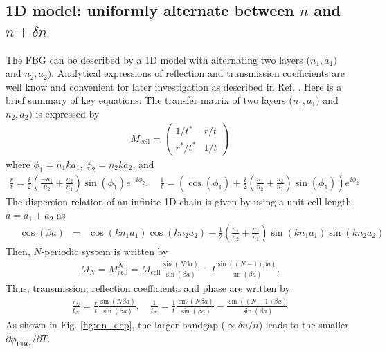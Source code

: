 \documentclass[aps,pra, onecolumn,superscriptaddress,nopacs,floatfix, showkeys, notitlepage]{revtex4-1}
\begin{document}
\subsection{1D model: uniformly alternate between $n$ and $n+\delta n$}
The FBG can be described by a 1D model with alternating two layers ($n_1, a_1)$ and $n_2, a_2)$. 
Analytical expressions of reflection and transmission coefficients are well know and convenient for later investigation as described in Ref. \cite{Bendickson1996}.
Here is a brief summary of key equations:
The transfer matrix of two layers ($n_1, a_1)$ and $n_2, a_2)$ is expressed by
\begin{eqnarray}
    M_{\mathrm{cell}}=\left(\begin{array}{cc}
1 / t^* & r / t \\
r^* / t^* & 1 / t
\end{array}\right)
\label{eq:tmat}
\end{eqnarray}
where $\phi_1=n_1 k a_1$, $\phi_2=n_2 k a_2$, and
\begin{eqnarray}
\frac{r}{t}  =\frac{i}{2}\left(\frac{-n_1}{n_2}+\frac{n_2}{n_1}\right) \sin \left(\phi_1\right) e^{-i\phi_2}, \quad
\frac{1}{t}  =\left(\cos \left(\phi_1\right)+\frac{i}{2}\left(\frac{n_1}{n_2}+\frac{n_2}{n_1}\right) \sin \left(\phi_1\right)\right) e^{i\phi_2}
\end{eqnarray}
The dispersion relation of an infinite 1D chain is given by using a unit cell length $a=a_1+a_2$ as
\begin{eqnarray}
    \quad \cos (\beta a)&=&\cos \left(k n_1 a_1\right) \cos \left(k n_2 a_2\right)-\frac{1}{2}\left(\frac{n_1}{n_2}+\frac{n_2}{n_1}\right) \sin \left(k n_1 a_1\right) \sin \left(k n_2 a_2\right)
\end{eqnarray}
Then, $N$-periodic system is written by 
\begin{eqnarray}
    M_N=M_\mathrm{cell}^N = M_\mathrm{cell}\frac{\sin(N\beta a)}{\sin(\beta a)}-I\frac{\sin((N-1)\beta a)}{\sin(\beta a)}.
\end{eqnarray}
Thus, transmission, reflection coefficienta and phase are written by \cite{Bendickson1996}
\begin{eqnarray}
    \frac{r_N}{t_N}=\frac{r}{t}\frac{\sin(N\beta a)}{\sin(\beta a)}, \quad
    \frac{1}{t_N}=\frac{1}{t}\frac{\sin(N\beta a)}{\sin(\beta a)}-\frac{\sin((N-1)\beta a)}{\sin(\beta a)}
\end{eqnarray}
As shown in Fig. \ref{fig:dn_dep}, the larger bandgap ($\propto \delta n/n$) leads to the smaller $\partial \phi_\mathrm{FBG}/\partial T$.
\end{document}
